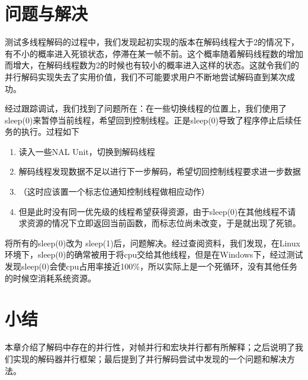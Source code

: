 \section{问题与解决}
\label{sec:parallelbuganddebug}

测试多线程解码的过程中，我们发现起初实现的版本在解码线程大于2的情况下，有不小的概率进入死锁状态，停滞在某一帧不前。这个概率随着解码线程数的增加而增大，在解码线程数为2的时候也有较小的概率进入这样的状态。这就令我们的并行解码实现失去了实用价值，我们不可能要求用户不断地尝试解码直到某次成功。

经过跟踪调试，我们找到了问题所在：在一些切换线程的位置上，我们使用了sleep(0)来暂停当前线程，希望回到控制线程。正是sleep(0)导致了程序停止后续任务的执行。过程如下
\begin{enumerate}
\item 读入一些NAL Unit，切换到解码线程
\item 解码线程发现数据不足以进行下一步解码，希望切回控制线程要求进一步数据
\item （这时应该置一个标志位通知控制线程做相应动作）
\item 但是此时没有同一优先级的线程希望获得资源，由于sleep(0)在其他线程不请求资源的情况下立即返回当前函数，而标志位尚未改变，于是就出现了死锁。
\end{enumerate}

将所有的sleep(0)改为 sleep(1)后，问题解决。经过查阅资料，我们发现，在Linux环境下，sleep(0)的确常被用于将cpu交给其他线程，但是在Windows下，经过测试发现sleep(0)会使cpu占用率接近100\%，所以实际上是一个死循环，没有其他任务的时候空消耗系统资源。

\section{小结}
\label{sec:sum5}

本章介绍了解码中存在的并行性，对帧并行和宏块并行都有所解释；之后说明了我们实现的解码器并行框架；最后提到了并行解码尝试中发现的一个问题和解决方法。

\cleardoublepage